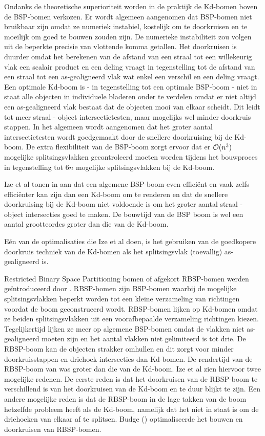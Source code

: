 Ondanks de theoretische superioriteit worden in de praktijk de Kd-bomen boven de BSP-bomen verkozen.
Er wordt algemeen aangenomen dat BSP-bomen niet bruikbaar zijn omdat ze numeriek instabiel, kostelijk om te doorkruisen en te moeilijk om goed te bouwen zouden zijn.
De numerieke instabiliteit zou volgen uit de beperkte precisie van vlottende komma getallen.  
Het doorkruisen is duurder omdat het berekenen van de afstand van een straal tot een willekeurig vlak een scalair product en een deling vraagt in tegenstelling tot de afstand van een straal tot een as-gealigneerd vlak wat enkel een verschil en een deling vraagt.
Een optimale Kd-boom is - in tegenstelling tot een optimale BSP-boom - niet in staat alle objecten in individuele bladeren onder te verdelen omdat er niet altijd een as-gealigneerd vlak bestaat dat de objecten mooi van elkaar scheidt.  
Dit leidt tot meer straal - object intersectietesten, maar mogelijks wel minder doorkruis stappen.
In het algemeen wordt aangenomen dat het groter aantal intersectietesten wordt goedgemaakt door de snellere doorkruising bij de Kd-boom.
De extra flexibiliteit van de BSP-boom zorgt ervoor dat er $\mathcal{O}(n^3)$ mogelijke splitsingsvlakken gecontroleerd moeten worden tijdens het bouwproces in tegenstelling tot $6n$ mogelijke splitsingsvlakken bij de Kd-boom.


Ize et al tonen in \cite{Ize} aan dat een algemene BSP-boom even efficiënt en vaak zelfs efficiënter kan zijn dan een Kd-boom om te renderen en dat de snellere doorkruising bij de Kd-boom niet voldoende is om het groter aantal straal - object intersecties goed te maken.
De bouwtijd van de BSP boom is wel een aantal grootteordes groter dan die van de Kd-boom. 

Eén van de optimalisaties die Ize et al doen, is het gebruiken van de goedkopere doorkruis techniek van de Kd-bomen als het splitsingsvlak (toevallig) as-gealigneerd is. 

Restricted Binary Space Partitioning bomen of afgekort RBSP-bomen werden geïntroduceerd door \authorKammaje{ }\cite{Kammaje}.
RBSP-bomen zijn BSP-bomen waarbij de mogelijke splitsingsvlakken beperkt worden tot een kleine verzameling van richtingen voordat de boom geconstrueerd wordt. 
RBSP-bomen lijken op Kd-bomen omdat ze beiden splitsingsvlakken uit een voorafbepaalde verzameling richtingen kiezen.
Tegelijkertijd lijken ze meer op algemene BSP-bomen omdat de vlakken niet as-gealigneerd moeten zijn en het aantal vlakken niet gelimiteerd is tot drie.
De RBSP-boom kan de objecten strakker omhullen en dit zorgt voor minder doorkruisstappen en driehoek intersecties dan Kd-bomen. 
De rendertijd van de RBSP-boom van \cite{Kammaje} was groter dan die van de Kd-boom.
Ize et al zien hiervoor twee mogelijke redenen. 
De eerste reden is dat het doorkruisen van de RBSP-boom te verschillend is van het doorkruisen van de Kd-boom en te duur blijkt te zijn.
Een andere mogelijke reden is dat de RBSP-boom in de lage takken van de boom hetzelfde probleem heeft als de Kd-boom, namelijk dat het niet in staat is om de driehoeken van elkaar af te splitsen.
Budge (\cite{Budge}) optimaliseerde het bouwen en doorkruisen van RBSP-bomen.


